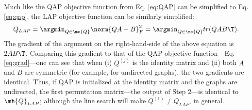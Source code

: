 \documentclass[10pt,journal,cspaper,compsoc]{IEEEtran}
\begin{document}
Much like the QAP objective function from Eq. \eqref{eq:QAP} can be simplified to Eq. \eqref{eq:qap}, the LAP objective function can be similarly simplified:
\begin{align}
	Q_{LAP}= \argmin_{Q \in \mc{Q}} \norm{QA-B}_F^2 = \argmin_{Q \in \mc{Q}} tr(QA B\T).
\end{align}
The gradient of the argument on the right-hand-side of the above equation is $2AB\T$.
Comparing this gradient to that of the QAP objective function---Eq. \eqref{eq:grad}---one can see that when (i) $Q^{(j)}$ is the identity matrix and (ii) both $A$ and $B$ are symmetric (for example, for undirected graphs), the two gradients are identical.  Thus, if QAP is initialized at the identity matrix and the graphs are undirected, the first permutation matrix---the output of Step 2---is identical to $\mh{Q}_{LAP}$; although the line search will make $Q^{(1)} \neq Q_{LAP}$, in general.  %

\end{document}
